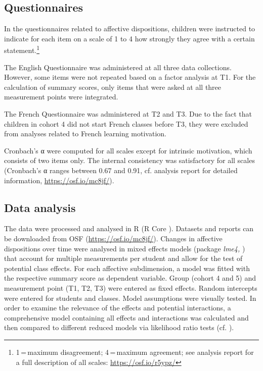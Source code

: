 \documentclass[output=paper]{langsci/langscibook}
\begin{document}
\subsection{Questionnaires}

In the questionnaires related to affective dispositions, children were instructed to indicate for each item on a scale of 1 to 4 how strongly they agree with a certain statement.\footnote{1\,=\,maximum disagreement; 4\,=\,maximum agreement; see analysis report for a full description of all scales: \url{https://osf.io/r5ypz/}}

The English Questionnaire was administered at all three data collections. However, some items were not repeated based on a factor analysis at T1. For the calculation of summary scores, only items that were asked at all three measurement points were integrated. 

The French Questionnaire was administered at T2 and T3. Due to the fact that children in cohort 4 did not start French classes before T3, they were excluded from analyses related to French learning motivation.

Cronbach’s α were computed for all scales except for intrinsic motivation, which consists of two items only. The internal consistency was satisfactory for all scales (Cronbach’s α ranges between 0.67 and 0.91, cf. analysis report for detailed information, \url{https://osf.io/mc8jf/}).

\subsection{Data analysis}

The data were processed and analysed in R (R Core \citealt{Team2019}). Datasets and reports can be downloaded from OSF (\url{https://osf.io/mc8jf/}). Changes in affective dispositions over time were analysed in mixed effects models (package \textit{lme4,} \citealt{BatesEtAl2015}) that account for multiple measurements per student and allow for the test of potential class effects. For each affective subdimension, a model was fitted with the respective summary score as dependent variable. Group (cohort 4 and 5) and measurement point (T1, T2, T3) were entered as fixed effects. Random intercepts were entered for students and classes. Model assumptions were visually tested. In order to examine the relevance of the effects and potential interactions, a comprehensive model containing all effects and interactions was calculated and then compared to different reduced models via likelihood ratio tests (cf. \citealt{Winter2013}). 
\end{document}
